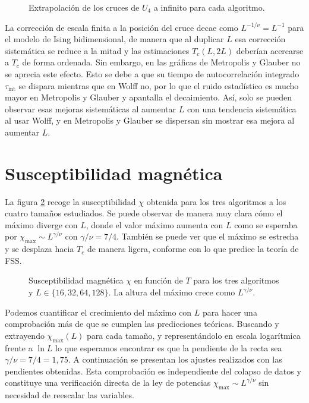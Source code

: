 \begin{figure}
  \centering
    
    \caption{Extrapolación de los cruces de $U_4$ a infinito para cada algoritmo.}
    \label{fig:extrp_u4}
\end{figure}

La corrección de escala finita a la posición del cruce decae como $L^{-1/\nu} = L^{-1}$ para el modelo de Ising bidimensional, de manera que al duplicar $L$ esa corrección sistemática se reduce a la mitad y las estimaciones $T_c(L,2L)$ deberían acercarse a $T_c$ de forma ordenada. Sin embargo, en las gráficas de Metropolis y Glauber no se aprecia este efecto. Esto se debe a que su tiempo de autocorrelación integrado $\tau_{\text{int}}$ se dispara mientras que en Wolff no, por lo que el ruido estadístico es mucho mayor en Metropolis y Glauber y apantalla el decaimiento. Así, solo se pueden observar esas mejoras sistemáticas al aumentar $L$ con una tendencia sistemática al usar Wolff, y en Metropolis y Glauber se dispersan sin mostrar esa mejora al aumentar $L$.

\section{Susceptibilidad magnética}

La figura \ref{fig:chi_bruta} recoge la susceptibilidad $\chi$ obtenida para los tres algoritmos a los cuatro tamaños estudiados. Se puede observar de manera muy clara cómo el máximo diverge con $L$, donde el valor máximo aumenta con $L$ como se esperaba por $\chi_{\max} \sim L^{\gamma/\nu}$ con $\gamma/\nu = 7/4$. También se puede ver que el máximo se estrecha y se desplaza hacia $T_c$ de manera ligera, conforme con lo que predice la teoría de FSS.

\begin{figure}
  \centering
  
  \caption{Susceptibilidad magnética $\chi$ en función de $T$ para los tres algoritmos y $L \in \{16, 32, 64, 128\}$. La altura del máximo crece como $L^{\gamma/\nu}$.}
  \label{fig:chi_bruta}
\end{figure}

Podemos cuantificar el crecimiento del máximo con $L$ para hacer una comprobación más de que se cumplen las predicciones teóricas. Buscando y extrayendo $\chi_{\max}(L)$ para cada tamaño, y representándolo en escala logarítmica frente a $\ln L$ lo que esperamos encontrar es que la pendiente de la recta sea $\gamma/\nu = 7/4 = 1{,}75$. A continuación se presentan los ajustes realizados con las pendientes obtenidas. Esta comprobación es independiente del colapso de datos y constituye una verificación directa de la ley de potencias $\chi_{\max} \sim L^{\gamma/\nu}$ sin necesidad de reescalar las variables.

